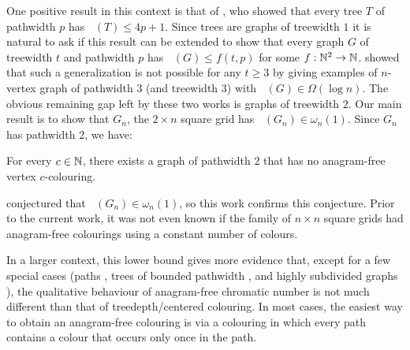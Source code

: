 \documentclass{patmorin}
\DeclareMathOperator{\afcn}{\dot{\chi}_\pi}
\begin{document}
One positive result in this context is that of
\citet{wilson.wood:anagram-free}, who showed that every tree $T$ of pathwidth $p$ has $\afcn(T)\le 4p+1$. Since trees are graphs of treewidth $1$ it is natural to ask if this result can be extended to show that every graph $G$ of treewidth $t$ and pathwidth $p$ has $\afcn(G)\le f(t,p)$ for some $f:\mathbb{N}^2\to\mathbb{N}$.  \citet{carmi.dujmovic.ea:anagram-free} showed that such a generalization is not possible for any $t\ge 3$ by giving examples of $n$-vertex graph of pathwidth $3$ (and treewidth $3$) with $\afcn(G)\in\Omega(\log n)$.  The obvious remaining gap left by these two works is graphs of treewidth $2$. Our main result is to show that $G_n$, the $2\times n$ square grid has $\afcn(G_n)\in\omega_n(1)$. Since $G_n$ has pathwidth 2, we have:

\begin{thm}\label{main_vertex}
    For every $c\in\mathbb{N}$, there exists a graph of pathwidth $2$ that has no anagram-free vertex $c$-colouring.
\end{thm}

\citet{wilson:anagram-free} conjectured that $\afcn(G_n)\in\omega_n(1)$, so this work confirms this conjecture.  Prior to the current work, it was not even known if the family of $n\times n$ square grids had anagram-free colourings using a constant number of colours.

In a larger context, this lower bound gives more evidence that, except for a few special cases (paths \cite{evdokimov:strongly,pleasants:non-repetitive,keranen:abelian}, trees of bounded pathwidth \cite{wilson.wood:anagram-free}, and highly subdivided graphs \cite{wilson.wood:anagram-free2}), the qualitative behaviour of anagram-free chromatic number is not much different than that of treedepth/centered colouring.  In most cases, the easiest way to obtain an anagram-free colouring is via a colouring in which every path contains a colour that occurs only once in the path.

%
%
\end{document}
